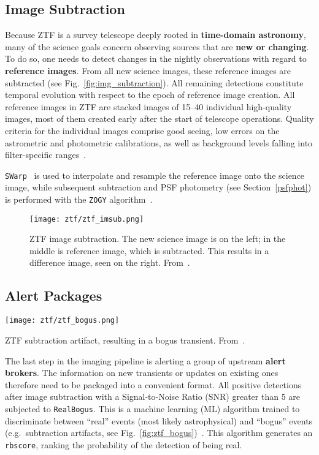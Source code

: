 \subsection{Image Subtraction}\label{ztf_image_subtraction}
Because ZTF is a survey telescope deeply rooted in \textbf{time-domain astronomy}, many of the science goals concern observing sources that are \textbf{new or changing}. To do so, one needs to detect changes in the nightly observations with regard to \textbf{reference images}. From all new science images, these reference images are subtracted (see Fig.~\ref{fig:img_subtraction}). All remaining detections constitute temporal evolution with respect to the epoch of reference image creation. All reference images in ZTF are stacked images of 15--40 individual high-quality images, most of them created early after the start of telescope operations. Quality criteria for the individual images comprise good seeing, low errors on the astrometric and photometric calibrations, as well as background levels falling into filter-specific ranges~\cite{Masci2019}.

\texttt{SWarp}~ is used to interpolate and resample the reference image onto the science image, while subsequent subtraction and PSF photometry (see Section~\ref{psfphot}) is performed with the \texttt{ZOGY} algorithm~.

\begin{figure}[h!]
    \texttt{[image: ztf/ztf\_imsub.png]}
    \caption[ZTF image subtraction]{ZTF image subtraction. The new science image is on the left; in the middle is reference image, which is subtracted. This results in a difference image, seen on the right. From~\cite{Mahabal2019}.}
\end{figure}

\subsection{Alert Packages}\label{ztf_alerts}
\begin{marginfigure}
    \texttt{[image: ztf/ztf\_bogus.png]}
    \caption[ZTF subtraction artifact]{ZTF subtraction artifact, resulting in a bogus transient. From~\cite{Mahabal2019}.}
\end{marginfigure}

The last step in the imaging pipeline is alerting a group of upstream \textbf{alert brokers}. The information on new transients or updates on existing ones therefore need to be packaged into a convenient format. All positive detections after image subtraction with a Signal-to-Noise Ratio (SNR) greater than 5 are subjected to \texttt{RealBogus}. This is a machine learning (ML) algorithm trained to discriminate between ``real'' events (most likely astrophysical) and ``bogus'' events (e.g.\ subtraction artifacts, see Fig.~\ref{fig:ztf_bogus})~. This algorithm generates an \texttt{rbscore}, ranking the probability of the detection of being real.

